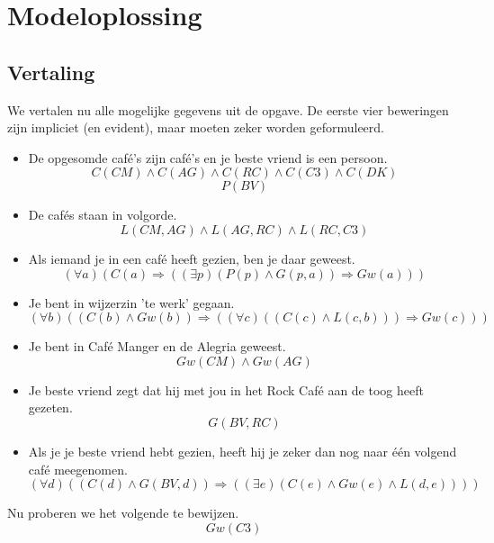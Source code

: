 \documentclass[alternative-exam.tex]{subfiles}
\begin{document}
\section{Modeloplossing}
\subsection{Vertaling}
We vertalen nu alle mogelijke gegevens uit de opgave. De eerste vier beweringen zijn impliciet (en evident), maar moeten zeker worden geformuleerd.
\begin{itemize}
\item De opgesomde caf\'e's zijn caf\'e's en je beste vriend is een persoon.
\[ C(CM)\wedge C(AG)\wedge C(RC)\wedge C(C3)\wedge C(DK) \]
\[ P(BV)\]
\item De caf\'es staan in volgorde.
\[
L(CM,AG) \wedge L(AG,RC) \wedge L(RC,C3)
\]
\item Als iemand je in een caf\'e heeft gezien, ben je daar geweest.
\[
(\forall a)(C(a) \Rightarrow ((\exists p) (P(p) \wedge G(p,a)) \Rightarrow Gw(a)))
\]
\item Je bent in wijzerzin 'te werk' gegaan.
\[
(\forall b)(( C(b) \wedge Gw(b)) \Rightarrow ((\forall c)(( C(c) \wedge L(c,b)))\Rightarrow Gw(c)))
\]
\item Je bent in Caf\'e Manger en de Alegria geweest.
\[
Gw(CM) \wedge Gw(AG)
\]
\item Je beste vriend zegt dat hij met jou in het Rock Caf\'e aan de toog heeft gezeten.
\[
G(BV,RC)
\]
\item Als je je beste vriend hebt gezien, heeft hij je zeker dan nog naar \'e\'en volgend caf\'e meegenomen.
\[
(\forall d) ((C(d) \wedge G(BV,d)) \Rightarrow ((\exists e) (C(e) \wedge Gw(e) \wedge L(d,e))))
\]
\end{itemize}
Nu proberen we het volgende te bewijzen.
\[
Gw(C3)
\]
\end{document}
